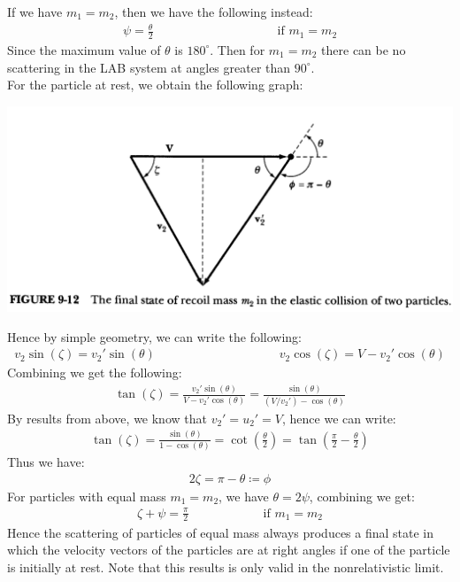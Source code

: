 \documentclass[11pt,oneside]{book}
\theoremstyle{break}
\theoremstyle{break}
\begin{document}
If we have $m_1 = m_2$, then we have the following instead:
\begin{align*}
\psi = \frac{\theta}{2} \qquad \qquad \qquad \qquad\qquad \text{if }m_1 = m_2
\end{align*}
Since the maximum value of $\theta$ is $180^\circ$. Then for $m_1 = m_2$ there can be no scattering in the LAB system at angles greater than $90^\circ$. \\

For the particle at rest, we obtain the following graph:
\begin{center}
\includegraphics[scale=0.35]{restParticle.png}
\end{center}
Hence by simple geometry, we can write the following:
\begin{align*}
v_2 \sin(\zeta) = v_2' \sin(\theta) \qquad\qquad\qquad\qquad\qquad v_2 \cos(\zeta) = V- v_2' \cos(\theta)
\end{align*}
Combining we get the following:
\begin{align*}
\tan(\zeta) = \frac{v_2'\sin(\theta)}{V- v_2' \cos(\theta)} = \frac{\sin(\theta)}{(V/v_2')-\cos(\theta)}
\end{align*}
By results from above, we know that $v_2' = u_2' = V$, hence we can write:
\begin{align*}
\tan(\zeta) = \frac{\sin(\theta)}{1 - \cos(\theta)} = \cot\left( \frac{\theta}{2}\right) = \tan\left( \frac{\pi}{2} - \frac{\theta}{2}\right)
\end{align*}
Thus we have:
\begin{align*}
2\zeta = \pi - \theta \coloneqq \phi
\end{align*}
For particles with equal mass $m_1 = m_2$, we have $\theta = 2\psi$, combining we get:
\begin{align*}
\zeta + \psi = \frac{\pi}{2} \qquad\qquad\qquad \text{if }m_1 = m_2
\end{align*}
Hence the scattering of particles of equal mass always produces a final state in which the velocity vectors of the particles are at right angles if one of the particle is initially at rest. Note that this results is only valid in the nonrelativistic limit.\\
\end{document}
